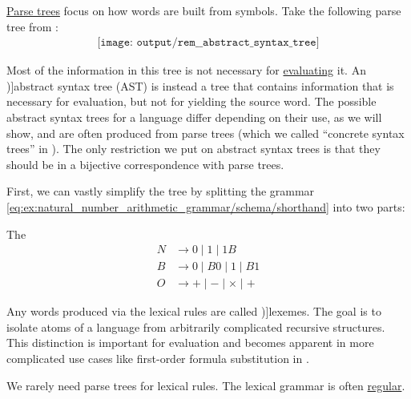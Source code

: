 \begin{remark}\label{rem:abstract_syntax_tree}
  \hyperref[def:parse_tree]{Parse trees} focus on how words are built from symbols. Take the following parse tree from :
  \begin{equation}\label{eq:rem:abstract_syntax_tree/base}
    \begin{aligned}
      \texttt{[image: output/rem\_\_abstract\_syntax\_tree]}
    \end{aligned}
  \end{equation}

  Most of the information in this tree is not necessary for \hyperref[rem:evaluation]{evaluating} it. An \term[en=abstract syntax tree (\cite[41]{Aho2006})]{abstract syntax tree} (AST) is instead a tree that contains information that is necessary for evaluation, but not for yielding the source word. The possible abstract syntax trees for a language differ depending on their use, as we will show, and are often produced from parse trees (which we called \enquote{concrete syntax trees} in ). The only restriction we put on abstract syntax trees is that they should be in a bijective correspondence with parse trees.

  First, we can vastly simplify the tree by splitting the grammar \eqref{eq:ex:natural_number_arithmetic_grammar/schema/shorthand} into two parts:
  \begin{thmenum}
     The 
    \begin{equation*}
      \begin{aligned}
        N &\to 0 \mid 1 \mid 1 B \\
        B &\to 0 \mid B 0 \mid 1 \mid B 1 \\
        O &\to + \mid - \mid \times \mid +
      \end{aligned}
    \end{equation*}

    Any words produced via the lexical rules are called \term[ru=лексемы (\cite[329]{Гладкий1973Языки})]{lexemes}. The goal is to isolate atoms of a language from arbitrarily complicated recursive structures. This distinction is important for evaluation and becomes apparent in more complicated use cases like first-order formula substitution in .

    We rarely need parse trees for lexical rules. The lexical grammar is often \hyperref[def:chomsky_hierarchy/regular]{regular}.


\end{thmenum}
\end{remark}
